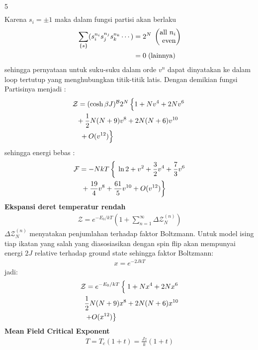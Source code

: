 \documentclass[a4paper  , 6 pt]{article}
\begin{document}
\begin{tiny}
\begin{multicols} {5}
\begin{align}
\end{align}
Karena $s_i = \pm 1$ maka dalam fungsi partisi akan berlaku 
\begin{align}
\sum_{\{s\}} (s_i^{n_i } s_j^{n_j} s_k^{n_k} \cdots ) & = 2^N  \hspace{0.1 cm} 
\begin{pmatrix}
 \text{all } n_i \\   \text{ even} 
\end{pmatrix}
\nonumber \\ 
& = 0 \hspace{0.1 cm} (\text{lainnya}) \nonumber
\end{align}
sehingga pernyataan untuk suku-suku dalam orde $v^n$ dapat dinyatakan ke dalam loop tertutup yang menghubungkan titik-titik latis. Dengan demikian fungsi Partisinya menjadi :
\begin{align}
& \mathcal{Z} = (\cosh \beta J)^{\mathcal{B}} 2^N \left \{ 1+  N v^4 + 2 N  v^6   \frac{}{}  \right . \nonumber \\ 
& \hspace{ 0.2 cm}  + \frac{1}{2} N (N + 9) v^8 + 2 N (N + 6 )v^{10}   \nonumber \\ 
& \hspace{ 0.2 cm} \left. \frac{}{}+ O(v^{12}) \right \} 
\end{align}
sehingga energi bebas :
\begin{align}
& \mathcal{F} = - Nk T \left \{  \frac{}{} \ln 2  + v^2 + \frac{3}{2} v^4 + \frac{7}{3} v^6 \right.  \nonumber \\ 
& \hspace{ 0.2 cm} \left. \frac{}{} + \frac{19}{4} v^8 + \frac{61}{5} v^{10} + O(v^{12}) \right\}
\end{align}
\textbf{Ekspansi deret temperatur rendah} \\
\begin{align}
\mathcal{Z} = e^{- E_0 / kT   } \left( 1+ \sum_{n = 1}^\infty  \Delta  \mathcal{Z}_N^{(n)} \right) 
\end{align}
$\Delta \mathcal{Z}_N^{(n)}$ menyatakan penjumlahan terhadap faktor Boltzmann. Untuk model ising tiap ikatan yang salah yang diasosiasikan dengan spin flip akan mempunyai energi $2J$ relative terhadap ground state sehingga faktor Boltzmann:
\begin{align}
x= e^{- 2 J kT} 
\end{align}
jadi:
\begin{align}
& \mathcal{Z} =  e^{- E_0 /k T}  \left \{ \frac{}{} 1 + N x^4  + 2 N x^6 \right. \nonumber \\ 
& \hspace{ 0.2 cm}   \frac{1}{2}  N(N + 9 ) x^8  + 2 N (N+ 6) x^{10} \nonumber \\   & \hspace{ 0.2 cm} \left. + O(x^{12}) \right \}
\end{align}
\textbf{Mean Field Critical Exponent}\\
\begin{align}
T = T_c (1+ t )  = \frac{J z}{k} ( 1 + t)
\end{align}

\end{multicols}
\end{tiny}
\end{document}
